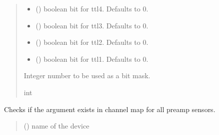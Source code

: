 \documentclass[letterpaper,10pt,english]{sphinxmanual}
\begin{document}
\begin{fulllineitems}
\begin{fulllineitems}
\begin{quote}
\begin{description}
\begin{itemize}
\item {} 
\sphinxAtStartPar
{} (\sphinxstyleliteralemphasis{\sphinxupquote{, }}) \textendash{} boolean bit for ttl4. Defaults to 0.

\item {} 
\sphinxAtStartPar
{} (\sphinxstyleliteralemphasis{\sphinxupquote{, }}) \textendash{} boolean bit for ttl3. Defaults to 0.

\item {} 
\sphinxAtStartPar
{} (\sphinxstyleliteralemphasis{\sphinxupquote{, }}) \textendash{} boolean bit for ttl2. Defaults to 0.

\item {} 
\sphinxAtStartPar
{} (\sphinxstyleliteralemphasis{\sphinxupquote{, }}) \textendash{} boolean bit for ttl1. Defaults to 0.

\end{itemize}

\sphinxAtStartPar
Integer number to be used as a bit mask.

\sphinxAtStartPar
int

\end{description}\end{quote}

\end{fulllineitems}


\begin{fulllineitems}
\label{\detokenize{PodApi.Devices:PodApi.Devices.PodDevice_8401HR.Pod8401HR.IsPreampDeviceSupported}}
\pysigstartsignatures
{}
\pysigstopsignatures
\sphinxAtStartPar
Checks if the argument exists in channel map for all preamp sensors.
\begin{quote}\begin{description}
\sphinxAtStartPar
{} () \textendash{} name of the device


\end{description}
\end{quote}
\end{fulllineitems}
\end{fulllineitems}
\end{document}
